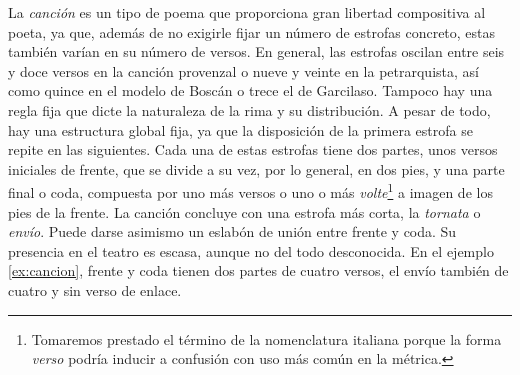La \textit{canción} es un tipo de poema que proporciona gran libertad compositiva al poeta, ya que, además de no exigirle fijar un número de estrofas concreto, estas también varían en su número de versos. En general, las estrofas oscilan entre seis y doce versos en la canción provenzal o nueve y veinte en la petrarquista, así como quince en el modelo de Boscán o trece el de Garcilaso. Tampoco hay una regla fija que dicte la naturaleza de la rima y su distribución. A pesar de todo, hay una estructura global fija, ya que la disposición de la primera estrofa se repite en las siguientes. Cada una de estas estrofas tiene dos partes, unos versos iniciales de frente, que se divide a su vez, por lo general, en dos pies, y una parte final o coda, compuesta por uno más versos o uno o más \textit{volte}\footnote{Tomaremos prestado el término de la nomenclatura italiana porque la forma \textit{verso} podría inducir a confusión con uso más común en la métrica.} a imagen de los pies de la frente. La canción concluye con una estrofa más corta, la \textit{tornata} o \textit{envío}. Puede darse asimismo un eslabón de unión entre frente y coda. Su presencia en el teatro es escasa, aunque no del todo desconocida. En el ejemplo \ref{ex:cancion}, frente y coda tienen dos partes de cuatro versos, el envío también de cuatro y sin verso de enlace.

